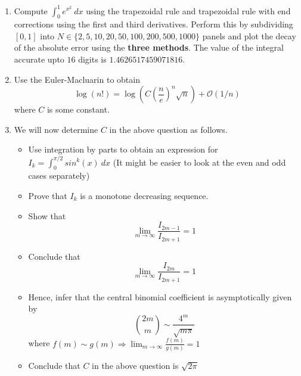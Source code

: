 \documentclass{article}
\begin{document}
\begin{enumerate}
\item Compute $\displaystyle \int_{0}^{1} e^{x^{2}} \ dx$ using the trapezoidal rule and 
trapezoidal rule with end corrections using the first and third derivatives. Perform this
by subdividing $[0, 1]$ into $N \in \{2, 5, 10, 20, 50, 100, 200, 500, 1000\}$ panels and 
plot the decay of the absolute error using the \textbf{three methods}. The value of the 
integral accurate upto $16$ digits is $1.4626517459071816$.

\item Use the Euler-Macluarin to obtain
\begin{equation*}
\log (n!) = \log \displaystyle \left(C \left(\frac{n}{e} \right)^{n} \sqrt{n} \right) 
    + \mathcal{O}(1/n)
\end{equation*}
where $C$ is some constant.

\item We will now determine $C$ in the above question as follows.
\begin{itemize}
    \item Use integration by parts to obtain an expression for $I_{k} = \displaystyle
        \int_{0}^{\pi/2} sin^{k}(x)\ dx$ (It might be easier to look at the even and odd
        cases separately)

    \item Prove that $I_{k}$ is a monotone decreasing sequence.

    \item Show that
        \begin{equation*}
            \lim_{m \to \infty} \frac{I_{2m - 1}}{I_{2m + 1}} = 1
        \end{equation*}

    \item Conclude that
        \begin{equation*}
            \lim_{m \to \infty} \frac{I_{2m}}{I_{2m + 1}} = 1
        \end{equation*}

    \item Hence, infer that the central binomial coefficient is asymptotically given by
        \begin{equation*}
            \binom{2m}{m} \sim \frac{4^{m}}{\sqrt{m\pi}}
        \end{equation*}
        where $f(m) \sim g(m) \Longrightarrow \lim_{m \to \infty} \displaystyle
        \frac{f(m)}{g(m)} = 1$

    \item Conclude that $C$ in the above question is $\sqrt{2\pi}$


\end{itemize}
\end{enumerate}
\end{document}
